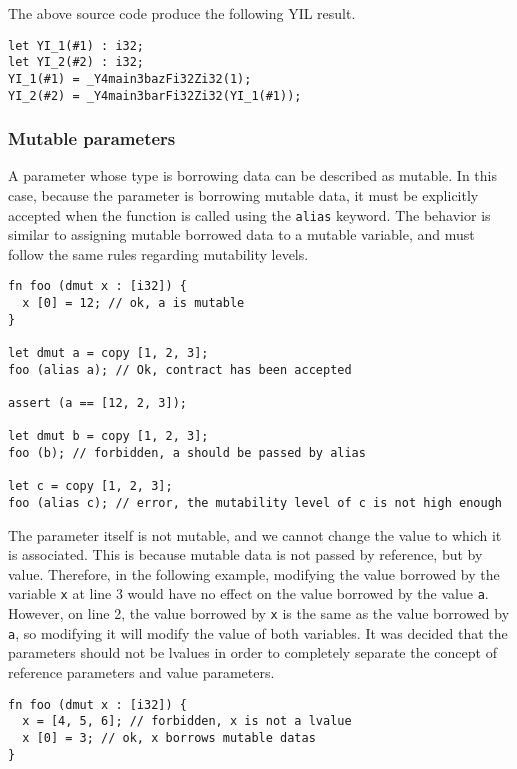 The above source code produce the following YIL result.

\begin{lstlisting}[style=intermediateVerb]
let YI_1(#1) : i32;
let YI_2(#2) : i32;
YI_1(#1) = _Y4main3bazFi32Zi32(1);
YI_2(#2) = _Y4main3barFi32Zi32(YI_1(#1));
\end{lstlisting}


\subsubsection {Mutable parameters}

A parameter whose type is borrowing data can be described as mutable. In this
case, because the parameter is borrowing mutable data, it must be explicitly
accepted when the function is called using the \texttt{alias} keyword. The
behavior is similar to assigning mutable borrowed data to a mutable variable,
and must follow the same rules regarding mutability levels.

\begin{lstlisting}[style=coloredverbatim]
fn foo (dmut x : [i32]) {
  x [0] = 12; // ok, a is mutable
}

let dmut a = copy [1, 2, 3];
foo (alias a); // Ok, contract has been accepted

assert (a == [12, 2, 3]);

let dmut b = copy [1, 2, 3];
foo (b); // forbidden, a should be passed by alias

let c = copy [1, 2, 3];
foo (alias c); // error, the mutability level of c is not high enough
\end{lstlisting}

The parameter itself is not mutable, and we cannot change the value to which it
is associated. This is because mutable data is not passed by reference, but by
value. Therefore, in the following example, modifying the value borrowed by the
variable \texttt{x} at line 3 would have no effect on the value borrowed by the
value \texttt{a}. However, on line 2, the value borrowed by \texttt{x} is the
same as the value borrowed by \texttt{a}, so modifying it will modify the value
of both variables. It was decided that the parameters should not be lvalues in
order to completely separate the concept of reference parameters and value
parameters.

\begin{lstlisting}[style=coloredverbatim]
fn foo (dmut x : [i32]) {
  x = [4, 5, 6]; // forbidden, x is not a lvalue
  x [0] = 3; // ok, x borrows mutable datas
}
\end{lstlisting}

